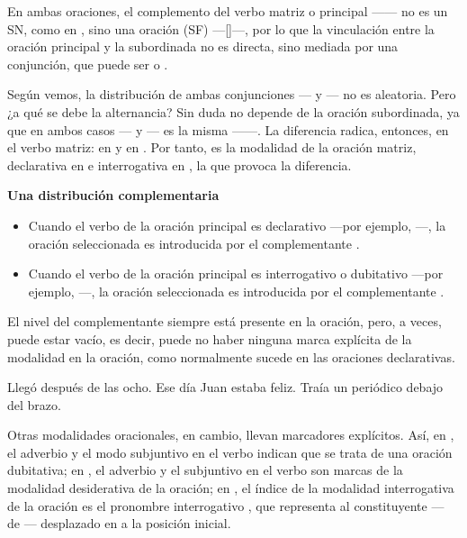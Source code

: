 En ambas oraciones, el complemento del verbo matriz o principal ------ no es un SN, como en , sino una oración
(SF) ---[]---, por lo que la vinculación entre la
oración principal y la subordinada no es directa, sino mediada por una
conjunción, que puede ser  o .

Según vemos, la distribución de ambas conjunciones --- y ---
no es aleatoria. Pero ¿a qué se debe la alternancia? Sin duda no depende de la
oración subordinada, ya que en ambos casos --- y
--- es la misma ------. La diferencia
radica, entonces, en el verbo matriz:  en  y
 en . Por tanto, es la modalidad de la oración
matriz, declarativa en  e interrogativa en , la
que provoca la diferencia.

\begin{destacado}
\textbf{Una distribución complementaria}
\begin{itemize}
  \item Cuando el verbo de la oración principal es declarativo ---por ejemplo,
        ---, la oración seleccionada es
        introducida por el complementante  .
  \item Cuando el verbo de la oración principal es interrogativo o dubitativo
        ---por ejemplo, ---, la oración
        seleccionada es introducida por el complementante 
        .
\end{itemize}
\end{destacado}

El nivel del complementante siempre está presente en la oración, pero, a veces,
puede estar vacío, es decir, puede no haber ninguna marca explícita de la
modalidad en la oración, como normalmente sucede en las oraciones declarativas.

\begin{exe}
  \ex Llegó después de las ocho.
  \ex Ese día Juan estaba feliz.
  \ex\label{ex:06-periodico} Traía un periódico debajo del brazo.
\end{exe}

Otras modalidades oracionales, en cambio, llevan marcadores explícitos. Así, en
, el adverbio  y el modo subjuntivo en el
verbo indican que se trata de una oración dubitativa; en , el
adverbio  y el subjuntivo en el verbo son marcas de la modalidad
desiderativa de la oración; en , el índice de la modalidad
interrogativa de la oración es el pronombre interrogativo , que
representa al constituyente --- de
--- desplazado en  a la posición
inicial.

